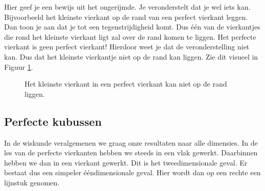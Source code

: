 
Hier geef je een bewijs uit het ongerijmde. Je veronderstelt dat je wel iets kan. Bijvoorbeeld het kleinste vierkant op de rand van een perfect vierkant leggen. Dan toon je aan dat je tot een tegenstrijdigheid komt. Dus \'e\'en van de vierkantjes die rond het kleinste vierkant ligt zal over de rand komen te liggen. Het perfecte vierkant is geen perfect vierkant! Hierdoor weet je dat de veronderstelling niet kan. Dus dat het kleinste vierkantje niet op de rand kan liggen. Zie dit visueel in Figuur \ref{fig:pv_kleinstevierkant}.

\begin{figure}
\begin{center}
  
\end{center}
\caption{Het kleinste vierkant in een perfect vierkant kan niet op de rand liggen.}
\label{fig:pv_kleinstevierkant}
\end{figure}

\subsection{Perfecte kubussen}

In de wiskunde veralgemenen we graag onze resultaten naar alle dimensies. In de les van de perfecte vierkanten hebben we steeds in een vlak gewerkt. Daarbinnen hebben we dan in een vierkant gewerkt. Dit is het tweedimensionale geval. Er bestaat dus een simpeler \'e\'endimensionale geval. Hier wordt dan op een rechte een lijnstuk genomen.%




